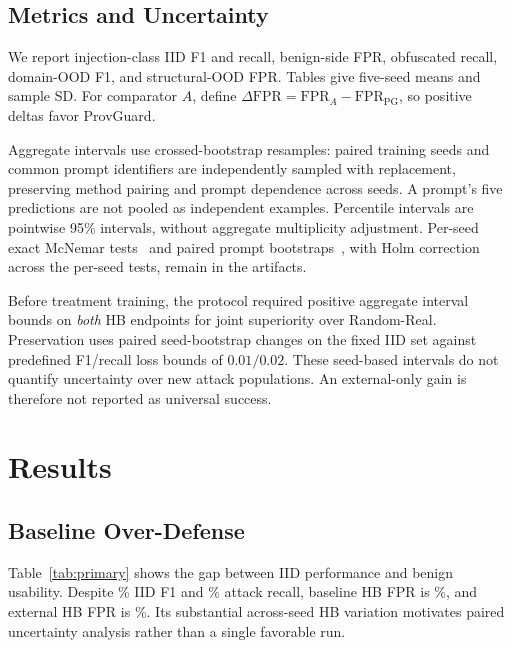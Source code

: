 \documentclass[conference]{IEEEtran}
\begin{document}
\subsection{Metrics and Uncertainty}
We report injection-class IID F1 and recall, benign-side FPR, obfuscated recall, domain-OOD F1, and structural-OOD FPR. Tables give five-seed means and sample SD. For comparator $A$, define $\Delta\mathrm{FPR}=\mathrm{FPR}_A-\mathrm{FPR}_{\mathrm{PG}}$, so positive deltas favor ProvGuard.

Aggregate intervals use \BootstrapN{} crossed-bootstrap resamples: paired training seeds and common prompt identifiers are independently sampled with replacement, preserving method pairing and prompt dependence across seeds. A prompt's five predictions are not pooled as independent examples. Percentile intervals are pointwise 95\% intervals, without aggregate multiplicity adjustment. Per-seed exact McNemar tests~\cite{mcnemar} and paired prompt bootstraps~\cite{efron}, with Holm correction across the per-seed tests, remain in the artifacts.

Before treatment training, the protocol required positive aggregate interval bounds on \emph{both} HB endpoints for joint superiority over Random-Real. Preservation uses paired seed-bootstrap changes on the fixed IID set against predefined F1/recall loss bounds of $0.01/0.02$. These seed-based intervals do not quantify uncertainty over new attack populations. An external-only gain is therefore not reported as universal success.

\begin{table}[t]
\caption{Final primary results: mean $\pm$ sample SD over five seeds, fixed threshold \Threshold. HB FPR uses \NHB{} public texts (\NCuratedHB{} curated + \NExternal{} external). ProvGuard uses the predefined $K=\PrimaryK$. Bold denotes the best observed mean among these four arms, not statistical superiority.}
\label{tab:primary}
\centering\footnotesize
\setlength{\tabcolsep}{1.3pt}
\renewcommand{\arraystretch}{1.14}

\end{table}

\section{Results}
\subsection{Baseline Over-Defense}
Table~\ref{tab:primary} shows the gap between IID performance and benign usability. Despite \BaseIIDPct\% IID F1 and \BaseRecPct\% attack recall, baseline HB FPR is \BaseHBPct\%, and external HB FPR is \BaseExtPct\%. Its substantial across-seed HB variation motivates paired uncertainty analysis rather than a single favorable run.
\end{document}
